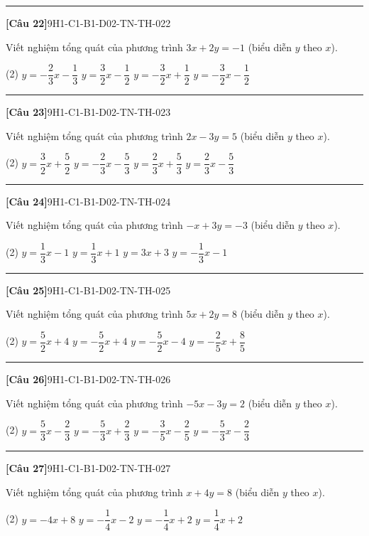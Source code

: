 \documentclass[12pt,a4paper]{article}
\newif\ifloigiai
\newenvironment{cauhoi}[2]{%
  \par\medskip\noindent\rule{\textwidth}{0.4pt}\par\nopagebreak
  \noindent\textbf{[#1]}\hfill{\scriptsize\ttfamily #2}\par\nopagebreak\smallskip}{\par}
\newcommand{\dapan}[1]{\ifloigiai\par\smallskip\noindent\textit{Đáp án:} \textbf{#1}\par\fi}
\begin{document}
\begin{cauhoi}{Câu 22}{9H1-C1-B1-D02-TN-TH-022}
Viết nghiệm tổng quát của phương trình $3x+2y=-1$ (biểu diễn $y$ theo $x$).
\begin{tasks}(2)
\task $y=-\dfrac{2}{3}x-\dfrac{1}{3}$
\task $y=\dfrac{3}{2}x-\dfrac{1}{2}$
\task $y=-\dfrac{3}{2}x+\dfrac{1}{2}$
\task $y=-\dfrac{3}{2}x-\dfrac{1}{2}$
\end{tasks}
\dapan{D}
\end{cauhoi}
\begin{cauhoi}{Câu 23}{9H1-C1-B1-D02-TN-TH-023}
Viết nghiệm tổng quát của phương trình $2x-3y=5$ (biểu diễn $y$ theo $x$).
\begin{tasks}(2)
\task $y=\dfrac{3}{2}x+\dfrac{5}{2}$
\task $y=-\dfrac{2}{3}x-\dfrac{5}{3}$
\task $y=\dfrac{2}{3}x+\dfrac{5}{3}$
\task $y=\dfrac{2}{3}x-\dfrac{5}{3}$
\end{tasks}
\dapan{D}
\end{cauhoi}
\begin{cauhoi}{Câu 24}{9H1-C1-B1-D02-TN-TH-024}
Viết nghiệm tổng quát của phương trình $-x+3y=-3$ (biểu diễn $y$ theo $x$).
\begin{tasks}(2)
\task $y=\dfrac{1}{3}x-1$
\task $y=\dfrac{1}{3}x+1$
\task $y=3x+3$
\task $y=-\dfrac{1}{3}x-1$
\end{tasks}
\dapan{A}
\end{cauhoi}
\begin{cauhoi}{Câu 25}{9H1-C1-B1-D02-TN-TH-025}
Viết nghiệm tổng quát của phương trình $5x+2y=8$ (biểu diễn $y$ theo $x$).
\begin{tasks}(2)
\task $y=\dfrac{5}{2}x+4$
\task $y=-\dfrac{5}{2}x+4$
\task $y=-\dfrac{5}{2}x-4$
\task $y=-\dfrac{2}{5}x+\dfrac{8}{5}$
\end{tasks}
\dapan{B}
\end{cauhoi}
\begin{cauhoi}{Câu 26}{9H1-C1-B1-D02-TN-TH-026}
Viết nghiệm tổng quát của phương trình $-5x-3y=2$ (biểu diễn $y$ theo $x$).
\begin{tasks}(2)
\task $y=\dfrac{5}{3}x-\dfrac{2}{3}$
\task $y=-\dfrac{5}{3}x+\dfrac{2}{3}$
\task $y=-\dfrac{3}{5}x-\dfrac{2}{5}$
\task $y=-\dfrac{5}{3}x-\dfrac{2}{3}$
\end{tasks}
\dapan{D}
\end{cauhoi}
\begin{cauhoi}{Câu 27}{9H1-C1-B1-D02-TN-TH-027}
Viết nghiệm tổng quát của phương trình $x+4y=8$ (biểu diễn $y$ theo $x$).
\begin{tasks}(2)
\task $y=-4x+8$
\task $y=-\dfrac{1}{4}x-2$
\task $y=-\dfrac{1}{4}x+2$
\task $y=\dfrac{1}{4}x+2$
\end{tasks}
\dapan{C}
\end{cauhoi}
\end{document}
